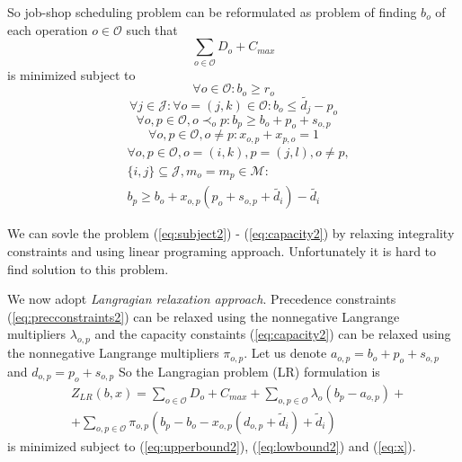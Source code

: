 \documentclass[a4paper,journal,twocolumn]{IEEEtran}
\begin{document}
So job-shop scheduling problem can be reformulated as problem of finding $b_o$ of each operation
$o\in\mathcal{O}$ such that
\begin{equation}\label{eq:subject2}
	 \sum_{o\in\mathcal{O}}D_o + C_{max}
\end{equation}
is minimized subject to
\begin{equation}\label{eq:lowbound2}
	\forall o\in\mathcal{O}: b_o \ge r_o
\end{equation}
\begin{equation}\label{eq:upperbound2}
	\forall j \in \mathcal{J}: \forall o=(j,k)\in\mathcal{O}: b_o\le \tilde{d_j}-p_o
\end{equation}
\begin{equation}\label{eq:precconstraints2}
	\forall o,p \in\mathcal{O}, o\prec_o p:b_p \ge b_o+p_o+s_{o,p}
\end{equation}
\begin{equation}\label{eq:x}
\forall o,p\in\mathcal{O},o\neq p: x_{o,p}+x_{p,o} = 1
\end{equation}
\begin{align}\label{eq:capacity2}
	& \forall o,p\in\mathcal{O},o=(i,k),p=(j,l),o\neq p, \\
	& \{i,j\}\subseteq\mathcal{J}, m_o=m_p\in \mathcal{M}: \nonumber \\
	& b_p \ge b_o + x_{o,p}(p_o+s_{o,p} + \tilde{d_i}) - \tilde{d_i}\nonumber
\end{align}

We can sovle the problem (\ref{eq:subject2}) - (\ref{eq:capacity2}) by relaxing integrality constraints
and using linear programing approach. Unfortunately it is hard to find solution to this problem.

We now adopt \emph{Langragian relaxation approach}. 
Precedence constraints (\ref{eq:precconstraints2}) can be relaxed using the nonnegative Langrange multipliers $\lambda_{o,p}$
and the capacity constaints (\ref{eq:capacity2}) can be relaxed using the nonnegative Langrange multipliers $\pi_{o,p}$.
Let us denote $a_{o,p} = b_o + p_o + s_{o,p}$ and $d_{o,p} = p_o + s_{o,p}$
So the Langragian problem (LR) formulation is 
\begin{align}
	& Z_{LR}\left(b,x\right)=\sum_{o\in\mathcal{O}}D_o + C_{max} + \sum_{o,p\in\mathcal{O}}\lambda_o\left(b_p-a_{o,p}\right) + \nonumber \\
	& +\sum_{o,p\in\mathcal{O}}\pi_{o,p}\left(b_p-b_o-x_{o,p}(d_{o,p}+\tilde{d}_i)+\tilde{d}_i\right) 
\end{align}
is minimized subject to (\ref{eq:upperbound2}), (\ref{eq:lowbound2}) and (\ref{eq:x}).
\end{document}

